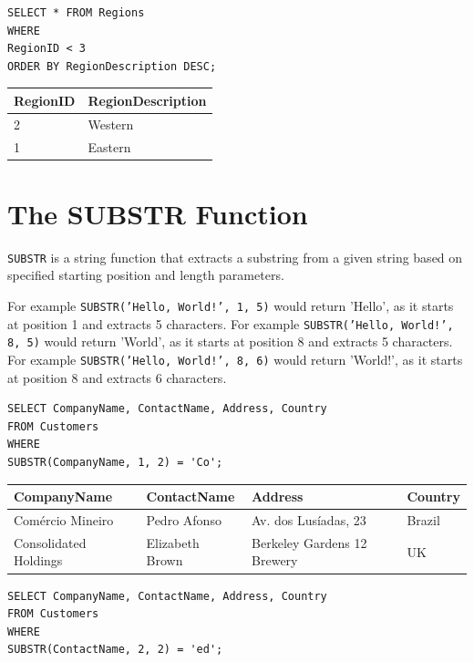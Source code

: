 \documentclass[10pt]{article}
\begin{document}
\begin{verbatim}
SELECT * FROM Regions
WHERE 
RegionID < 3
ORDER BY RegionDescription DESC;
\end{verbatim}

\begin{table}[H]
\begin{tabular}{|l|l|}
\hline
RegionID	& RegionDescription \\
\hline
2	& Western \\
1	& Eastern \\
\hline
\end{tabular}
\end{table}



\section{The SUBSTR Function}
\texttt{SUBSTR} is a string function that extracts a substring from a given string based on specified 
starting position and length parameters.

For example \texttt{SUBSTR('Hello, World!', 1, 5)} would return 'Hello', as it starts at position 1 and extracts 5 characters.
For example \texttt{SUBSTR('Hello, World!', 8, 5)} would return 'World', as it starts at position 8 and extracts 5 characters.
For example \texttt{SUBSTR('Hello, World!', 8, 6)} would return 'World!', as it starts at position 8 and extracts 6 characters.

\begin{verbatim}
SELECT CompanyName, ContactName, Address, Country 
FROM Customers 
WHERE 
SUBSTR(CompanyName, 1, 2) = 'Co';
\end{verbatim}


\begin{table}[H]
\begin{tabular}{|l|l|l|l|}
\hline
CompanyName	& ContactName	& Address	& Country \\
\hline
Comércio Mineiro	& Pedro Afonso	& Av. dos Lusíadas, 23	& Brazil \\
Consolidated Holdings	& Elizabeth Brown	& Berkeley Gardens 12  Brewery	& UK \\
\hline
\end{tabular}
\end{table}



\begin{verbatim}
SELECT CompanyName, ContactName, Address, Country 
FROM Customers 
WHERE 
SUBSTR(ContactName, 2, 2) = 'ed';
\end{verbatim}
\end{document}

